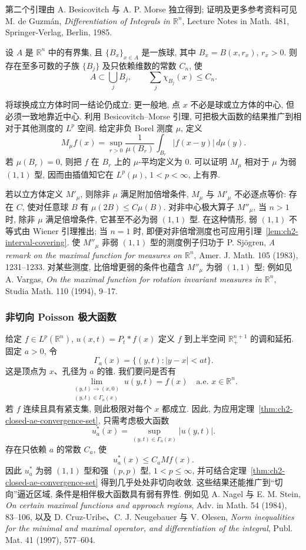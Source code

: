 第二个引理由 A. Besicovitch 与 A. P. Morse 独立得到; 证明及更多参考资料可见 M. de Guzmán, \emph{Differentiation of Integrals in $\mathbb R^n$}, Lecture Notes in Math. 481, Springer-Verlag, Berlin, 1985.
\begin{Theorem}
\label{thm:ch2-besicovitch-morse-covering}
设 $A$ 是 $\mathbb R^n$ 中的有界集, 且 $\{B_x\}_{x\in A}$ 是一族球, 其中 $B_x=B(x,r_x)$, $r_x>0$. 则存在至多可数的子族 $\{B_j\}$ 及只依赖维数的常数 $C_n$, 使
\[
 A\subset\bigcup_jB_j,
 \qquad
 \sum_j\chi_{B_j}(x)\le C_n.
\]
\end{Theorem}

将球换成立方体时同一结论仍成立; 更一般地, 点 $x$ 不必是球或立方体的中心, 但必须一致地靠近中心. 利用 Besicovitch--Morse 引理, 可把极大函数的结果推广到相对于其他测度的 $L^p$ 空间. 给定非负 Borel 测度 $\mu$, 定义
\[
 M_\mu f(x)=\sup_{r>0}\frac1{\mu(B_r)}\int_{B_r}|f(x-y)|\,d\mu(y).
\]
若 $\mu(B_r)=0$, 则把 $f$ 在 $B_r$ 上的 $\mu$-平均定义为 $0$. 可以证明 $M_\mu$ 相对于 $\mu$ 为弱 $(1,1)$ 型, 因而由插值知它在 $L^p(\mu)$, $1<p<\infty$, 上有界.

\hypertarget{chapter-02-page-057}{}
若以立方体定义 $M'_\mu$, 则除非 $\mu$ 满足附加倍增条件, $M_\mu$ 与 $M'_\mu$ 不必逐点等价: 存在 $C$, 使对任意球 $B$ 有 $\mu(2B)\le C\mu(B)$. 对非中心极大算子 $M''_\mu$, 当 $n>1$ 时, 除非 $\mu$ 满足倍增条件, 它甚至不必为弱 $(1,1)$ 型. 在这种情形, 弱 $(1,1)$ 不等式由 Wiener 引理推出; 当 $n=1$ 时, 即便对非倍增测度也可应用引理~\ref{lem:ch2-interval-covering}. 使 $M''_\mu$ 非弱 $(1,1)$ 型的测度例子归功于 P. Sjögren, \emph{A remark on the maximal function for measures on $\mathbb R^n$}, Amer. J. Math. 105 (1983), 1231--1233. 对某些测度, 比倍增更弱的条件也蕴含 $M''_\mu$ 为弱 $(1,1)$ 型; 例如见 A. Vargas, \emph{On the maximal function for rotation invariant measures in $\mathbb R^n$}, Studia Math. 110 (1994), 9--17.

\subsubsection{非切向 Poisson 极大函数}
\label{subsec:ch2-nontangential-poisson-maximal}
给定 $f\in L^p(\mathbb R^n)$, $u(x,t)=P_t*f(x)$ 定义 $f$ 到上半空间 $\mathbb R_+^{n+1}$ 的调和延拓. 固定 $a>0$, 令
\[
 \Gamma_a(x)=\{(y,t):|y-x|<at\}.
\]
这是顶点为 $x$、孔径为 $a$ 的锥. 我们要问是否有
\[
 \lim_{\substack{(y,t)\to(x,0)\\(y,t)\in\Gamma_a(x)}}u(y,t)=f(x)
 \quad\text{a.e. }x\in\mathbb R^n.
\]
若 $f$ 连续且具有紧支集, 则此极限对每个 $x$ 都成立. 因此, 为应用定理~\ref{thm:ch2-closed-ae-convergence-set}, 只需考虑极大函数
\[
 u_a^*(x)=\sup_{(y,t)\in\Gamma_a(x)}|u(y,t)|.
\]
存在只依赖 $a$ 的常数 $C_a$, 使
\[
 u_a^*(x)\le C_aMf(x).
\]
因此 $u_a^*$ 为弱 $(1,1)$ 型和强 $(p,p)$ 型, $1<p\le\infty$, 并可结合定理~\ref{thm:ch2-closed-ae-convergence-set} 得到几乎处处非切向收敛. 这些结果还能推广到“切向”逼近区域, 条件是相伴极大函数具有弱有界性. 例如见 A. Nagel 与 E. M. Stein, \emph{On certain maximal functions and approach regions}, Adv. in Math. 54 (1984), 83--106, 以及 D. Cruz-Uribe、C. J. Neugebauer 与 V. Olesen, \emph{Norm inequalities for the minimal and maximal operator, and differentiation of the integral}, Publ. Mat. 41 (1997), 577--604.

